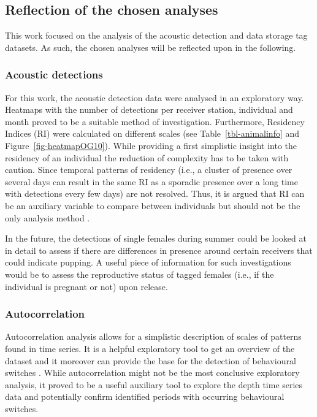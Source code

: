 \documentclass[
  authoryear,
  review,
  3p]{elsarticle}
\begin{document}
\hypertarget{sec-disc-reflection}{%
\subsection{Reflection of the chosen
analyses}\label{sec-disc-reflection}}

This work focused on the analysis of the acoustic detection and data
storage tag datasets. As such, the chosen analyses will be reflected
upon in the following.

\hypertarget{sec-disc-reflection-acoustic}{%
\subsubsection{Acoustic detections}\label{sec-disc-reflection-acoustic}}

For this work, the acoustic detection data were analysed in an
exploratory way. Heatmaps with the number of detections per receiver
station, individual and month proved to be a suitable method of
investigation. Furthermore, Residency Indices (RI) were calculated on
different scales (see Table~\ref{tbl-animalinfo} and
Figure~\ref{fig-heatmapOG10}). While providing a first simplistic
insight into the residency of an individual the reduction of complexity
has to be taken with caution. Since temporal patterns of residency
(i.e., a cluster of presence over several days can result in the same RI
as a sporadic presence over a long time with detections every few days)
are not resolved. Thus, it is argued that RI can be an auxiliary
variable to compare between individuals but should not be the only
analysis method \citep{kraft_2023}.

In the future, the detections of single females during summer could be
looked at in detail to assess if there are differences in presence
around certain receivers that could indicate pupping. A useful piece of
information for such investigations would be to assess the reproductive
status of tagged females (i.e., if the individual is pregnant or not)
upon release.

\hypertarget{sec-disc-reflection-acf}{%
\subsubsection{Autocorrelation}\label{sec-disc-reflection-acf}}

Autocorrelation analysis allows for a simplistic description of scales
of patterns found in time series. It is a helpful exploratory tool to
get an overview of the dataset \citep{dray_2010} and it moreover can
provide the base for the detection of behavioural switches
\citep{gurarie_2016}. While autocorrelation might not be the most
conclusive exploratory analysis, it proved to be a useful auxiliary tool
to explore the depth time series data and potentially confirm identified
periods with occurring behavioural switches.
\end{document}
